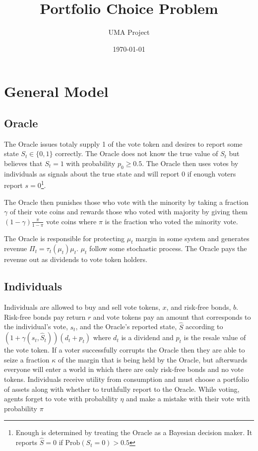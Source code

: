 \documentclass[12pt]{article}
\title{Portfolio Choice Problem}
\author{UMA Project}
\date{\today}
\begin{document}
\maketitle


\section{General Model}


\subsection{Oracle}

  The Oracle issues totaly supply 1 of the vote token and desires to report some state
  $S_t \in \{0, 1\}$ correctly. The Oracle does not know the true value of $S_t$ but believes that
  $S_t = 1$ with probability $p_0 \geq 0.5$. The Oracle then uses votes by individuals as signals
  about the true state and will report $0$ if enough voters report $s = 0$\footnote{Enough is
  determined by treating the Oracle as a Bayesian decision maker. It reports $\hat{S} = 0$ if
  $\text{Prob}(S_t = 0) > 0.5$}.

  The Oracle then punishes those who vote with the minority by taking a fraction $\gamma$ of their
  vote coins and rewards those who voted with majority by giving them $(1 - \gamma) \frac{\pi}{1 -
  \pi}$ vote coins where $\pi$ is the fraction who voted the minority vote.

  The Oracle is responsible for protecting $\mu_t$ margin in some system and generates revenue
  $\Pi_t = \tau_t(\mu_t) \mu_t$. $\mu_t$ follow some stochastic process. The Oracle pays the revenue
  out as dividends to vote token holders.


\subsection{Individuals}

  Individuals are allowed to buy and sell vote tokens, $x$, and  risk-free bonds, $b$. Risk-free
  bonds pay return $r$ and vote tokens pay an amount that corresponds to the individual's vote,
  $s_t$, and the Oracle's reported state, $\hat{S}$ according to $(1 + \gamma(s_t, \hat{S}_t)) (d_t
  + p_t)$ where $d_t$ is a dividend and $p_t$ is the resale value of the vote token. If a voter
  successfully corrupts the Oracle then they are able to seize a fraction $\kappa$ of the margin
  that is being held by the Oracle, but afterwards everyone will enter a world in which there are
  only risk-free bonds and no vote tokens. Individuals receive utility from consumption and must
  choose a portfolio of assets along with whether to truthfully report to the Oracle. While voting,
  agents forget to vote with probability $\eta$ and make a mistake with their vote with probability
  $\pi$
\end{document}
